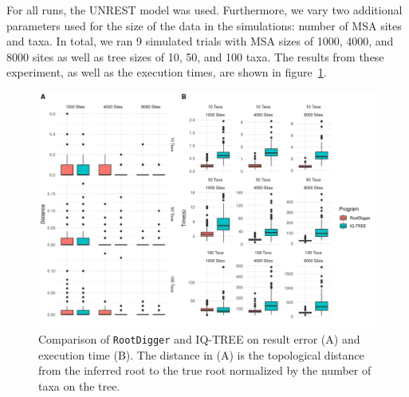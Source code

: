 \documentclass{article}
\newcommand{\RootDiggertt}{\texttt{RootDigger}}
\begin{document}
For all runs, the UNREST model was used. Furthermore, we vary two additional
parameters used for the size of the data in the simulations: number of MSA sites
and taxa.  In total, we ran 9 simulated trials with MSA sizes of 1000, 4000, and
8000 sites as well as tree sizes of 10, 50, and 100 taxa. The results from these
experiment, as well as the execution times, are shown in
figure~\ref{fig:timing-box-plot}. 


\begin{figure}
  \begin{center}
    \includegraphics[width=\linewidth]{./figs/time_distance_boxplot.png}
    \caption{Comparison of \RootDiggertt{} and IQ-TREE on result error (A) and
      execution time (B). The distance in (A) is the topological distance from
      the inferred root to the true root normalized by the number of taxa on the
      tree.
    \label{fig:timing-box-plot}}
\end{center}
\end{figure}
\end{document}
